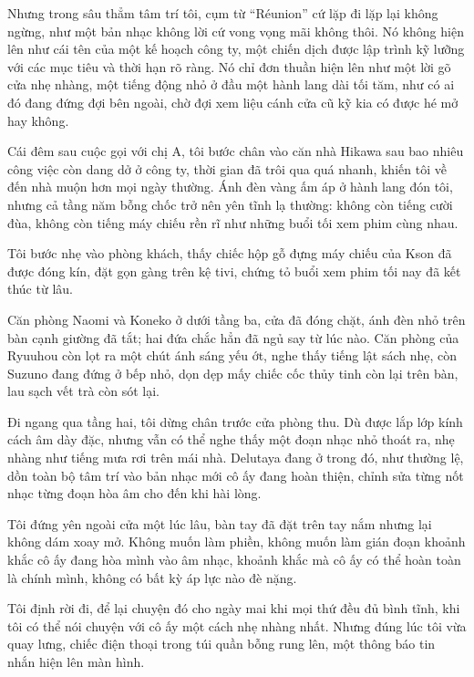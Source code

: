 \documentclass[../main.tex]{subfiles}
\begin{document}
Nhưng trong sâu thẳm tâm trí tôi, cụm từ ``Réunion'' cứ lặp đi lặp lại không ngừng, như một bản nhạc không lời cứ vong vọng mãi không thôi. Nó không hiện lên như cái tên của một kế hoạch công ty, một chiến dịch được lập trình kỹ lưỡng với các mục tiêu và thời hạn rõ ràng. Nó chỉ đơn thuần hiện lên như một lời gõ cửa nhẹ nhàng, một tiếng động nhỏ ở đầu một hành lang dài tối tăm, như có ai đó đang đứng đợi bên ngoài, chờ đợi xem liệu cánh cửa cũ kỹ kia có được hé mở hay không.

\ct

Cái đêm sau cuộc gọi với chị A, tôi bước chân vào căn nhà Hikawa sau bao nhiêu công việc còn dang dở ở công ty, thời gian đã trôi qua quá nhanh, khiến tôi về đến nhà muộn hơn mọi ngày thường. Ánh đèn vàng ấm áp ở hành lang đón tôi, nhưng cả tầng năm bỗng chốc trở nên yên tĩnh lạ thường: không còn tiếng cười đùa, không còn tiếng máy chiếu rền rĩ như những buổi tối xem phim cùng nhau.

Tôi bước nhẹ vào phòng khách, thấy chiếc hộp gỗ đựng máy chiếu của Kson đã được đóng kín, đặt gọn gàng trên kệ tivi, chứng tỏ buổi xem phim tối nay đã kết thúc từ lâu.

Căn phòng Naomi và Koneko ở dưới tầng ba, cửa đã đóng chặt, ánh đèn nhỏ trên bàn cạnh giường đã tắt; hai đứa chắc hẳn đã ngủ say từ lúc nào. Căn phòng của Ryuuhou còn lọt ra một chút ánh sáng yếu ớt, nghe thấy tiếng lật sách nhẹ, còn Suzuno đang đứng ở bếp nhỏ, dọn dẹp mấy chiếc cốc thủy tinh còn lại trên bàn, lau sạch vết trà còn sót lại.

Đi ngang qua tầng hai, tôi dừng chân trước cửa phòng thu. Dù được lắp lớp kính cách âm dày đặc, nhưng vẫn có thể nghe thấy một đoạn nhạc nhỏ thoát ra, nhẹ nhàng như tiếng mưa rơi trên mái nhà. Delutaya đang ở trong đó, như thường lệ, dồn toàn bộ tâm trí vào bản nhạc mới cô ấy đang hoàn thiện, chỉnh sửa từng nốt nhạc từng đoạn hòa âm cho đến khi hài lòng.

Tôi đứng yên ngoài cửa một lúc lâu, bàn tay đã đặt trên tay nắm nhưng lại không dám xoay mở. Không muốn làm phiền, không muốn làm gián đoạn khoảnh khắc cô ấy đang hòa mình vào âm nhạc, khoảnh khắc mà cô ấy có thể hoàn toàn là chính mình, không có bất kỳ áp lực nào đè nặng.

Tôi định rời đi, để lại chuyện đó cho ngày mai khi mọi thứ đều đủ bình tĩnh, khi tôi có thể nói chuyện với cô ấy một cách nhẹ nhàng nhất. Nhưng đúng lúc tôi vừa quay lưng, chiếc điện thoại trong túi quần bỗng rung lên, một thông báo tin nhắn hiện lên màn hình.
\end{document}
